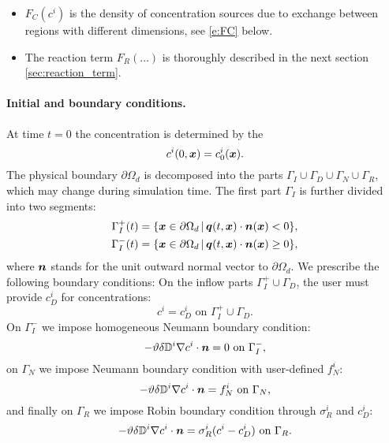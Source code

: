 \begin{itemize}
\item $F_C(c^i)$  is the density of concentration sources due to exchange between regions with different dimensions, see \eqref{e:FC} below.

\item The reaction term $F_R(\dots)$  is thoroughly described in the next section \ref{sec:reaction_term}.
\end{itemize}



\paragraph{Initial and boundary conditions.}
At time $t=0$ the concentration is determined by the 
$$ c^i(0,\mathbf{\boldsymbol{x}}) = c^i_0(\mathbf{\boldsymbol{x}}). $$
The physical boundary $\partial\Omega_d$ is decomposed into the parts $\Gamma_I\cup\Gamma_D\cup\Gamma_N\cup\Gamma_R$, which may change during simulation time.
The first part $\Gamma_I$ is further divided into two segments:
\begin{align*}
\Gamma_I^+(t) &= \{\mathbf{\boldsymbol{x}}\in \partial\Omega_d\,|\, \mathbf{\boldsymbol{q}}(t,\mathbf{\boldsymbol{x}})\cdot\mathbf{\boldsymbol{n}}(\mathbf{\boldsymbol{x}})<0\},\\
\Gamma_I^-(t) &= \{\mathbf{\boldsymbol{x}}\in \partial\Omega_d\,|\, \mathbf{\boldsymbol{q}}(t,\mathbf{\boldsymbol{x}})\cdot\mathbf{\boldsymbol{n}}(\mathbf{\boldsymbol{x}})\ge 0\},
\end{align*}
where $\mathbf{\boldsymbol{n}}$ stands for the unit outward normal vector to $\partial\Omega_d$.
We prescribe the following boundary conditions:
On the inflow parts $\Gamma_I^+\cup\Gamma_D$, the user must provide  $c_D^i$ for concentrations:
$$ c^i = c^i_D \mbox{ on }\Gamma_I^+\cup\Gamma_D. $$
On $\Gamma_I^-$ we impose homogeneous Neumann boundary condition:
$$ -\vartheta\delta{{\mathbb{D}}}^i\nabla c^i\cdot\mathbf{\boldsymbol{n}} = 0 \mbox{ on }\Gamma_I^-, $$
on $\Gamma_N$ we impose Neumann boundary condition with user-defined  $f^i_N$:
$$ -\vartheta\delta{{\mathbb{D}}}^i\nabla c^i\cdot\mathbf{\boldsymbol{n}} = f^i_N \mbox{ on }\Gamma_N, $$
and finally on $\Gamma_R$ we impose Robin boundary condition through  $\sigma^i_R$ and  $c^i_D$:
$$ -\vartheta\delta{{\mathbb{D}}}^i\nabla c^i\cdot\mathbf{\boldsymbol{n}} = \sigma^i_R(c^i-c^i_D) \mbox{ on }\Gamma_R. $$






